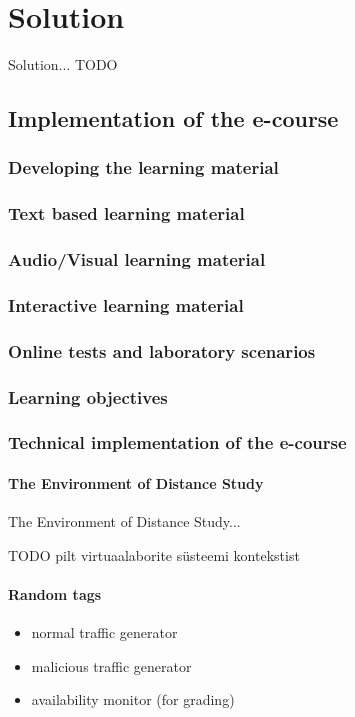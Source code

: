 \chapter{Solution}
\label{solution}
Solution...{\color{red} TODO }

\section{Implementation of the e-course}

\subsection{Developing the learning material}
\subsection{Text based learning material}
\subsection{Audio/Visual learning material}
\subsection{Interactive learning material}
\subsection{Online tests and laboratory scenarios}
\subsection{Learning objectives}
\subsection{Technical implementation of the e-course}

\subsubsection{The Environment of Distance Study}
\label{The Environment of Distance Study}
The Environment of Distance Study...

TODO pilt virtuaalaborite süsteemi kontekstist
\subsubsection{Random tags}
\begin{itemize}
	\item normal traffic generator
	\item malicious traffic generator
	\item availability monitor (for grading)
\end{itemize}

